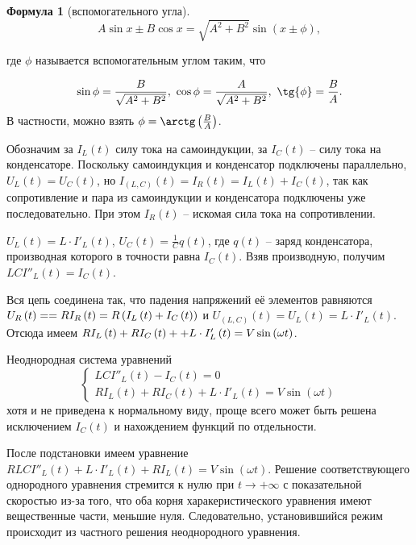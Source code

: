 \documentclass[a5paper,10pt]{article}
\newcommand{\br}[1]{\left(#1\right)}
\theoremstyle{definition}
\newtheorem*{formula}{Формула}
\begin{document}
\begin{framed}
\begin{formula}[вспомогательного угла]
$$A \sin{x} \pm B \cos{x} = \sqrt{A^2 + B^2} \sin\br{x \pm \phi},$$

где $\phi$ называется вспомогательным углом таким, что

$$
\sin{\phi} = \frac {B}{\sqrt{A^2 + B^2}},\ 
\cos{\phi} = \frac {A}{\sqrt{A^2 + B^2}},\
\tg{\phi} = \frac {B}{A}.
$$
В частности, можно взять $\phi = \arctg\br{\frac {B}{A}}$.
\end{formula}
\end{framed}

Обозначим за $I_{L}\br{t}$ силу тока на самоиндукции, за $I_{C}\br{t}$ -- силу тока на конденсаторе. Поскольку самоиндукция и конденсатор подключены параллельно, $U_{L}\br{t} = U_{C}\br{t}$, но $I_{\br{L, C}}\br{t} = I_{R}\br{t} = I_{L}\br{t} + I_{C}\br{t}$, так как сопротивление и пара из самоиндукции и конденсатора подключены уже последовательно. При этом $I_{R}\br{t}$ -- искомая сила тока на сопротивлении.

$U_{L}\br{t} = L \cdot I'_{L}\br{t}$, $U_{C}\br{t} = \frac {1}{C} q\br{t}$, где $q\br{t}$ -- заряд конденсатора, производная которого в точности равна $I_{C}\br{t}$. Взяв производную, получим $LC I''_{L}\br{t} = I_{C}\br{t}$.

Вся цепь соединена так, что падения напряжений её элементов равняются $U_{R}\br{t} = \linebreak = R I_{R}\br{t} = R \br{I_{L}\br{t} + I_{C}\br{t}}$ и $U_{\br{L, C}}\br{t} = U_{L}\br{t} = L \cdot I'_{L}\br{t}$. Отсюда имеем $R I_{L}\br{t} + R I_{C}\br{t} + \linebreak +  L \cdot I'_{L}\br{t} = V \sin\br{\omega t}$.

Неоднородная система уравнений 
$$\begin{cases}
    LC I''_{L}\br{t} - I_{C}\br{t} = 0 \\
    R I_{L}\br{t} + R I_{C}\br{t} + L \cdot I'_{L}\br{t} = V \sin\br{\omega t}
\end{cases}$$
хотя и не приведена к нормальному виду, проще всего может быть решена исключением $I_{C}\br{t}$ и нахождением функций по отдельности.

После подстановки имеем уравнение $RLC I''_{L}\br{t} + L \cdot I'_{L}\br{t} + R I_{L}\br{t} = V \sin\br{\omega t}$. Решение соответствующего однородного уравнения стремится к нулю при $t \to +\infty$ с показательной скоростью из-за того, что оба корня харакеристического уравнения имеют вещественные части, меньшие нуля. Следовательно, установившийся режим происходит из частного решения неоднородного уравнения.
\end{document}
